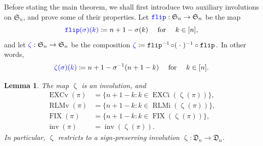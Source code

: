 \documentclass[reqno]{amsart}
\newtheorem{lemma}[theorem]{Lemma}
\theoremstyle{definition}
\newcommand{\defin}[1]{%
\relax\ifmmode%
\textcolor{blue}{#1}%
\else\textcolor{blue}{\emph{#1}}%
\fi%
}
\newcommand{\symS}{\mathfrak{S}}
\newcommand{\dArr}{\mathfrak{D}}
\DeclareMathOperator{\inv}{inv}
\DeclareMathOperator{\FIX}{FIX}
\DeclareMathOperator{\EXCi}{EXCi}
\DeclareMathOperator{\EXCv}{EXCv}
\DeclareMathOperator{\RLMv}{RLMv}
\DeclareMathOperator{\RLMi}{RLMi}
\DeclareMathOperator{\flipMap}{\mathtt{flip}}
\DeclareMathOperator{\zetaMap}{\zeta}
\begin{document}
Before stating the main theorem, we shall first 
introduce two auxiliary involutions on $ \symS_n$,
and prove some of their properties.
Let $\defin{\flipMap} : \symS_n \to \symS_n$ be the map 
\[
\defin{\flipMap(\sigma)(k)} \coloneqq n+1-\sigma(k) \quad \text{ for } \quad k\in [n],
\]
and let $\defin{\zetaMap} : \symS_n \to \symS_n$ be the composition
$
 \defin{\zetaMap} \coloneqq \flipMap^{-1} \circ (\;\cdot\;)^{-1} \circ \flipMap.
$
In other words,
\[
  \defin{\zetaMap(\sigma)(k)} \coloneqq n+1-\sigma^{-1}(n+1-k) \quad \text{ for } \quad k\in [n].
\] 
\begin{lemma}\label{lem:conjugateProps}
The map $\zetaMap$ is an involution, and
\begin{align*}
 \EXCv(\pi) &= \{ n+1-k : k \in \EXCi( \zetaMap(\pi)) \}, \\
 \RLMv(\pi) &= \{ n+1-k : k \in \RLMi( \zetaMap(\pi)) \},\\
 \FIX(\pi)  &= \{ n+1-k : k \in \FIX( \zetaMap(\pi)) \},\\
 \inv(\pi)  &= \inv(\zetaMap(\pi)).
\end{align*}
In particular, $\zetaMap$ restricts to a sign-preserving
involution $\zetaMap:\dArr_n \to  \dArr_n$.
\end{lemma}
\end{document}

